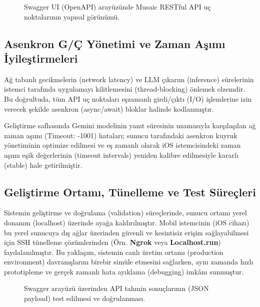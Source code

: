\documentclass[12pt, a4paper]{report}
\begin{document}
\begin{figure}[H]
    \centering
    \vspace{6cm} %
    \caption{Swagger UI (OpenAPI) arayüzünde Musaic RESTful API uç noktalarının yapısal görünümü.}
    \label{fig:swagger_endpoints}
\end{figure}

\subsection{Asenkron G/Ç Yönetimi ve Zaman Aşımı İyileştirmeleri}
Ağ tabanlı gecikmelerin (network latency) ve LLM çıkarım (inference) sürelerinin istemci tarafında uygulamayı kilitlemesini (thread-blocking) önlemek elzemdir. Bu doğrultuda, tüm API uç noktaları eşzamanlı girdi/çıktı (I/O) işlemlerine izin verecek şekilde asenkron (async/await) bloklar halinde kodlanmıştır.

Geliştirme safhasında Gemini modelinin yanıt süresinin uzamasıyla karşılaşılan ağ zaman aşımı (Timeout: -1001) hataları; sunucu tarafındaki asenkron kuyruk yönetiminin optimize edilmesi ve eş zamanlı olarak iOS istemcisindeki zaman aşımı eşik değerlerinin (timeout intervals) yeniden kalibre edilmesiyle kararlı (stable) hale getirilmiştir.

\subsection{Geliştirme Ortamı, Tünelleme ve Test Süreçleri}
Sistemin geliştirme ve doğrulama (validation) süreçlerinde, sunucu ortamı yerel donanım (localhost) üzerinde ayağa kaldırılmıştır. Mobil istemcinin (iOS cihazı) bu yerel sunucuya dış ağlar üzerinden güvenli ve kesintisiz erişim sağlayabilmesi için SSH tünelleme çözümlerinden (Örn. \textbf{Ngrok} veya \textbf{Localhost.run}) faydalanılmıştır. Bu yaklaşım, sistemin canlı üretim ortamı (production environment) davranışlarını birebir simüle etmesini sağlarken, aynı zamanda hızlı prototipleme ve gerçek zamanlı hata ayıklama (debugging) imkânı sunmuştur.

\begin{figure}[H]
    \centering
    \vspace{6cm} %
    \caption{Swagger arayüzü üzerinden API tahmin sonuçlarının (JSON payload) test edilmesi ve doğrulanması.}
    \label{fig:swagger_payload}
\end{figure}
\end{document}

